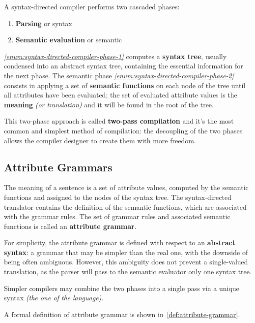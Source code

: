 \documentclass[english]{article}
\begin{document}
A syntax-directed compiler performs two cascaded phases:

\begin{enumerate}[label=phase \arabic*., ref=(Phase \arabic*), leftmargin=*, widest*=8, labelindent=1em]
  \item\label{enum:syntax-directed-compiler-phase-1} \textbf{Parsing} or syntax
  \item\label{enum:syntax-directed-compiler-phase-2} \textbf{Semantic evaluation} or semantic
\end{enumerate}

\textit{\ref{enum:syntax-directed-compiler-phase-1}} computes a \textbf{syntax tree}, usually condensed into an abstract syntax tree, containing the essential information for the next phase.
The semantic phase \textit{\ref{enum:syntax-directed-compiler-phase-2}} consists in applying a set of \textbf{semantic functions} on each node of the tree until all attributes have been evaluated;
the set of evaluated attribute values is the \textbf{meaning} \textit{(or translation)} and it will be found in the root of the tree.

This two-phase approach is called \textbf{two-pass compilation} and it's the most common and simplest method of compilation:
the decoupling of the two phases allows the compiler designer to create them with more freedom.

\subsection{Attribute Grammars}

The meaning of a sentence is a set of attribute values, computed by the semantic functions and assigned to the nodes of the syntax tree.
The syntax-directed translator contains the definition of the semantic functions, which are associated with the grammar rules.
The set of grammar rules and associated semantic functions is called an \textbf{attribute grammar}.

For simplicity, the attribute grammar is defined with respect to an \textbf{abstract syntax}:
a grammar that may be simpler than the real one, with the downside of being often ambiguous.
However, this ambiguity does not prevent a single-valued translation, as the parser will pass to the semantic evaluator only one syntax tree.

Simpler compilers may combine the two phases into a single pass via a unique syntax \textit{(the one of the language)}.

\bigskip
A formal definition of attribute grammar is shown in~\ref{def:attribute-grammar}.
\end{document}

